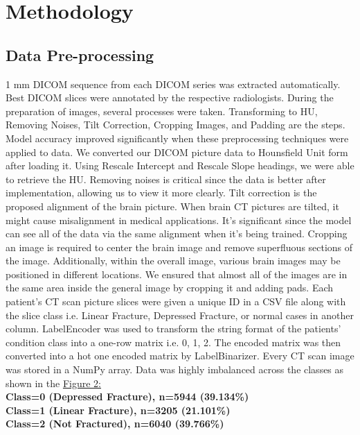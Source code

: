 \documentclass[sigconf]{acmart}
\begin{document}
\section{Methodology}
\subsection{Data Pre-processing}
1 mm DICOM sequence from each DICOM series was extracted automatically. Best DICOM slices were annotated by the respective radiologists. During the preparation of images, several processes were taken.
Transforming to HU, Removing Noises, Tilt Correction, Cropping Images, and Padding are the steps. Model accuracy improved significantly when these preprocessing techniques were applied to data. We converted our DICOM picture data to Hounsfield Unit form after loading it. Using Rescale Intercept and Rescale Slope headings, we were able to retrieve the HU. Removing noises is critical since the data is better after implementation, allowing us to view it more clearly. Tilt correction is the proposed alignment of the brain picture. When brain CT pictures are tilted, it might cause misalignment in medical applications. It's significant since the model can see all of the data via the same alignment when it's being trained. Cropping an image is required to center the brain image and remove superfluous sections of the image. Additionally, within the overall image, various brain images may be positioned in different locations. We ensured that almost all of the images are in the same area inside the general image by cropping it and adding pads. Each patient’s CT scan picture slices were given a unique ID in a CSV file along with the slice class i.e. Linear Fracture, Depressed Fracture, or normal cases in another column. LabelEncoder was used to transform the string format of the patients’ condition class into a one-row matrix i.e. 0, 1, 2. The encoded matrix was then converted into a hot one encoded matrix by LabelBinarizer. Every CT scan image was stored in a NumPy array. 
Data was highly imbalanced across the classes as shown in the \hyperref[Fig.2]{Figure 2:}\\
\textbf{Class=0 (Depressed Fracture), n=5944 (39.134\%)}\\
\textbf{Class=1 (Linear Fracture), n=3205 (21.101\%)}\\
\textbf{Class=2 (Not Fractured), n=6040 (39.766\%)}\\
\end{document}
